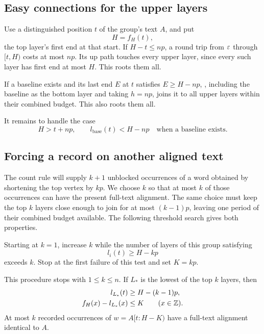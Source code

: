 \subsection{Easy connections for the upper layers}

Use a distinguished position $t$ of the group's text $A$, and put
\[
H=f_H(t),
\]
the top layer's first end at that start. If $H-t\le np$, a round trip from $\varepsilon$ through $[t,H)$ costs at most $np$. Its up path touches every upper layer, since every such layer has first end at most $H$. This roots them all.

If a baseline exists and its last end $E$ at $t$ satisfies $E\ge H-np$, , including the baseline as the bottom layer and taking $h=np$, joins it to all upper layers within their combined budget. This also roots them all.

It remains to handle the case
\begin{equation}\label{eq:hard-case}
H>t+np,
\qquad l_{\mathrm{base}}(t)<H-np
\quad\text{when a baseline exists}.
\end{equation}

\subsection{Forcing a record on another aligned text}

The count rule will supply $k+1$ unblocked occurrences of a word obtained by shortening the top vertex by $kp$. We choose $k$ so that at most $k$ of those occurrences can have the present full-text alignment. The same choice must keep the top $k$ layers close enough to join for at most $(k-1)p$, leaving one period of their combined budget available. The following threshold search gives both properties.

Starting at $k=1$, increase $k$ while the number of layers of this group satisfying
\[
l_i(t)\ge H-kp
\]
exceeds $k$. Stop at the first failure of this test and set $K=kp$.

\begin{lemma}\label{lem:choose-k}
This procedure stops with $1\le k\le n$. If $L_*$ is the lowest of the top $k$ layers, then
\begin{align}
l_{L_*}(t)&\ge H-(k-1)p,\label{eq:sharp-band}\\
f_H(x)-l_{L_*}(x)&\le K\qquad(x\in\mathbb Z).\label{eq:wide-band}
\end{align}
At most $k$ recorded occurrences of $w=A[t:H-K)$ have a full-text alignment identical to $A$.
\end{lemma}

